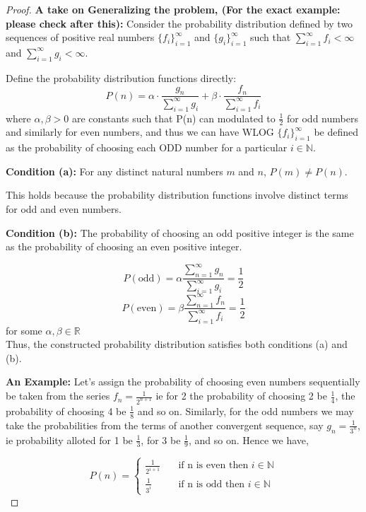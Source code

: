 \documentclass{article}
\theoremstyle{definition}
\begin{document}
\begin{proof}
  
    \textbf{A take on Generalizing the problem, (For the exact example: please check after this):}
    Consider the probability distribution defined by two sequences of positive real numbers \( \{f_i\}_{i=1}^{\infty} \) and \( \{g_i\}_{i=1}^{\infty} \) such that \( \sum_{i=1}^{\infty} f_i < \infty \) and \( \sum_{i=1}^{\infty} g_i < \infty \).

    Define the probability distribution functions directly:
    \[
    P(n) = \alpha \cdot \frac{g_n}{\sum_{i=1}^{\infty} g_i} + \beta \cdot \frac{f_n}{\sum_{i=1}^{\infty} f_i}
    \]
    where $\alpha, \beta> 0$ are constants such that P(n) can modulated to $\frac{1}{2}$ for odd numbers and similarly for even numbers, and thus we can have WLOG \( \{f_i\}_{i=1}^{\infty} \) be defined as the probability of choosing each ODD number for a particular $i \in \mathbb{N}$.

    \textbf{Condition (a):} For any distinct natural numbers \( m \) and \( n \), \( P(m) \neq P(n) \).
    
    This holds because the probability distribution functions involve distinct terms for odd and even numbers.

    \textbf{Condition (b):} The probability of choosing an odd positive integer is the same as the probability of choosing an even positive integer.

    \[
    P(\text{odd}) = \alpha\frac{\sum_{n=1}^{\infty} g_n}{\sum_{i=1}^{\infty} g_i} = \frac{1}{2}
    \]
    \[
    P(\text{even}) = \beta\frac{\sum_{n=1}^{\infty} f_n}{\sum_{i=1}^{\infty} f_i} = \frac{1}{2}
    \]
for some $\alpha, \beta \in \mathbb{R}$\\
    Thus, the constructed probability distribution satisfies both conditions (a) and (b).



    \textbf{An Example:}
    Let's assign the probability of choosing even numbers sequentially be taken from the series ${f_n} = \frac{1}{2^{n+1}}$ ie for 2 the probability of choosing 2 be $\frac{1}{4}$, the probability of choosing 4 be $\frac{1}{8}$ and so on. Similarly, for the odd numbers we may take the probabilities from the terms of another convergent sequence, say $g_n = \frac{1}{3^n}$, ie probability alloted for 1 be $\frac{1}{3}$, for 3 be $\frac{1}{9}$, and so on. Hence we have,

    \[
    P(n) = 
    \begin{cases}
        \frac{1}{2^{i+1}} & \quad \text{if n is even then } i \in \mathbb{N}\\
     \frac{1}{3^i} & \quad \text{if  n is odd then } i \in \mathbb{N}
    \end{cases}
    \]



\end{proof}
\end{document}
